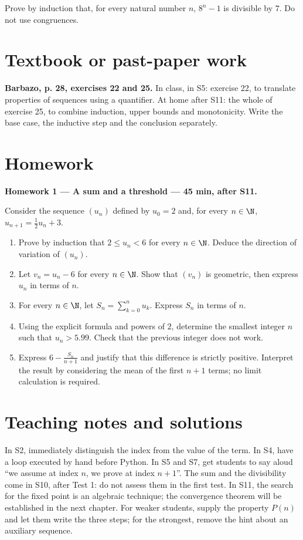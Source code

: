 Prove by induction that, for every natural number $n$, $8^n-1$ is divisible by $7$. Do not use congruences.

\section{Textbook or past-paper work}\textbf{Barbazo, p. 28, exercises 22 and 25.} In class, in S5: exercise 22, to translate properties of sequences using a quantifier. At home after S11: the whole of exercise 25, to combine induction, upper bounds and monotonicity. Write the base case, the inductive step and the conclusion separately.

\section{Homework}\textbf{Homework 1 --- A sum and a threshold --- 45 min, after S11.}\par Consider the sequence $(u_n)$ defined by $u_0=2$ and, for every $n\in\N$, $u_{n+1}=\frac12u_n+3$.
\begin{enumerate}\item Prove by induction that $2\le u_n<6$ for every $n\in\N$. Deduce the direction of variation of $(u_n)$.
\item Let $v_n=u_n-6$ for every $n\in\N$. Show that $(v_n)$ is geometric, then express $u_n$ in terms of $n$.
\item For every $n\in\N$, let $S_n=\displaystyle\sum_{k=0}^n u_k$. Express $S_n$ in terms of $n$.
\item Using the explicit formula and powers of $2$, determine the smallest integer $n$ such that $u_n>5.99$. Check that the previous integer does not work.
\item Express $6-\frac{S_n}{n+1}$ and justify that this difference is strictly positive. Interpret the result by considering the mean of the first $n+1$ terms; no limit calculation is required.\end{enumerate}

\ifmxteacher\mxnewpage\section{Teaching notes and solutions}\begin{teachernote}In S2, immediately distinguish the index from the value of the term. In S4, have a loop executed by hand before Python. In S5 and S7, get students to say aloud ``we assume at index $n$, we prove at index $n+1$''. The sum and the divisibility come in S10, after Test 1: do not assess them in the first test. In S11, the search for the fixed point is an algebraic technique; the convergence theorem will be established in the next chapter. For weaker students, supply the property $P(n)$ and let them write the three steps; for the strongest, remove the hint about an auxiliary sequence.\end{teachernote}

